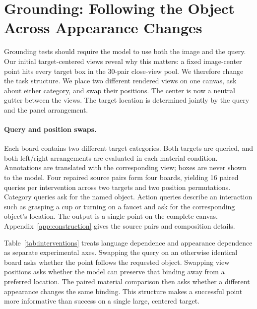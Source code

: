 \section{Grounding: Following the Object Across Appearance Changes}
\label{sec:grounding}

Grounding tests should require the model to use both the image and the query.
Our initial target-centered views reveal why this matters: a fixed image-center
point hits every target box in the 30-pair close-view pool. We therefore change the task structure. We place two different
rendered views on one canvas, ask about either category, and swap their positions.
The center is now a neutral gutter between the views. The target location is
determined jointly by the query and the panel arrangement.

\paragraph{Query and position swaps.}
Each board contains two different target categories. Both targets are queried,
and both left/right arrangements are evaluated in each material condition.
Annotations are translated with the corresponding view; boxes are never shown
to the model. Four repaired source pairs form four boards, yielding 16 paired queries per
intervention across two targets and two position permutations. Category queries
ask for the named object. Action queries describe an interaction such as grasping
a cup or turning on a faucet and ask for the corresponding object's location.
The output is a single point on the complete canvas.
Appendix~\ref{app:construction} gives the source pairs and composition details.

\begin{table}[t]
\centering\small
\setlength{\tabcolsep}{3pt}

\caption{Paired two-view interventions. Success rates are percentages over all
queries; invalid outputs count as failures. Original and Changed refer to the
image conditions for the listed intervention. Category and action queries use
full converted views; window interventions exchange only the specified region.
Flips count changes in hit status.}
\label{tab:interventions}
\end{table}

Table~\ref{tab:interventions} treats language dependence and appearance dependence
as separate experimental axes. Swapping the query on an otherwise identical
board asks whether the point follows the requested object. Swapping view positions
asks whether the model can preserve that binding away from a preferred location.
The paired material comparison then asks whether a different appearance changes
the same binding. This structure makes a successful point more informative than
success on a single large, centered target.

